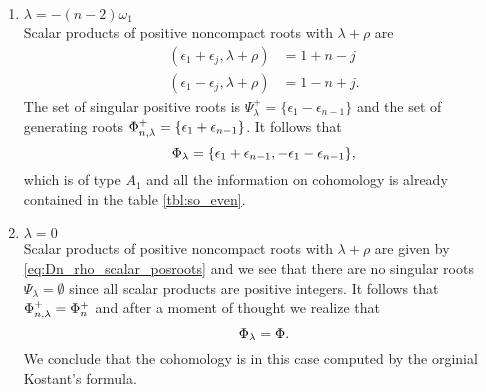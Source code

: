 \begin{enumerate}
 \item $ \lambda = -(n-2)\omega_1$\\
  Scalar products of positive noncompact roots with $\lambda+\rho$ are
  \begin{align*}
    (\epsilon_1 + \epsilon_j, \lambda+\rho) & = 1+n-j\\
    (\epsilon_1 - \epsilon_j, \lambda+\rho) & = 1-n+j.
  \end{align*}
  The set of singular positive roots is $\Psi^+_\lambda = \{ \epsilon_1 - \epsilon_{n-1} \}$ and the set of generating roots $\Phi^+_{n,\lambda} = \{ \epsilon_1 + \epsilon_{n-1} \}$. It  follows that
  \[
   \Phi_\lambda = \{\epsilon_1 + \epsilon_{n-1},-\epsilon_1 -\epsilon_{n-1} \},
  \]
  which is of type $A_1$ and all the information on cohomology is already contained in the table \ref{tbl:so_even}. %
  
 \item $ \lambda = 0$\\
  Scalar products of positive noncompact roots with $\lambda+\rho$ are given by \eqref{eq:Dn_rho_scalar_posroots} and we see that there are no singular roots $\Psi_\lambda = \emptyset$ since all scalar products are positive integers. It follows that $\Phi^+_{n,\lambda} = \Phi^+_n$ and after a moment of thought we realize that 
  \[
   \Phi_\lambda = \Phi.
  \]
  We conclude that the cohomology is in this case computed by the orginial Kostant's formula. %
  

\end{enumerate}
